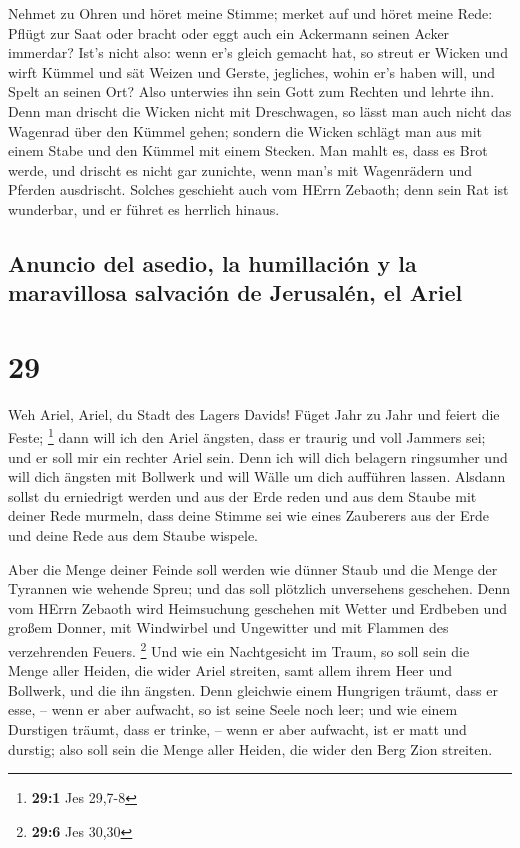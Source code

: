  Nehmet zu Ohren und höret meine Stimme; merket auf und
höret meine Rede:  Pflügt zur Saat oder bracht oder eggt
auch ein Ackermann seinen Acker immerdar?  Ist's nicht
also: wenn er's gleich gemacht hat, so streut er Wicken und wirft Kümmel
und sät Weizen und Gerste, jegliches, wohin er's haben will, und Spelt
an seinen Ort?  Also unterwies ihn sein Gott zum Rechten
und lehrte ihn.  Denn man drischt die Wicken nicht mit
Dreschwagen, so lässt man auch nicht das Wagenrad über den Kümmel gehen;
sondern die Wicken schlägt man aus mit einem Stabe und den Kümmel mit
einem Stecken.  Man mahlt es, dass es Brot werde, und
drischt es nicht gar zunichte, wenn man's mit Wagenrädern und Pferden
ausdrischt.  Solches geschieht auch vom HErrn Zebaoth;
denn sein Rat ist wunderbar, und er führet es herrlich hinaus.

\hypertarget{anuncio-del-asedio-la-humillaciuxf3n-y-la-maravillosa-salvaciuxf3n-de-jerusaluxe9n-el-ariel}{%
\subsection{Anuncio del asedio, la humillación y la maravillosa
salvación de Jerusalén, el
Ariel}\label{anuncio-del-asedio-la-humillaciuxf3n-y-la-maravillosa-salvaciuxf3n-de-jerusaluxe9n-el-ariel}}

\hypertarget{section-28}{%
\section{29}\label{section-28}}

 Weh Ariel, Ariel, du Stadt des Lagers Davids! Füget Jahr
zu Jahr und feiert die Feste; \footnote{\textbf{29:1} Jes 29,7-8}
 dann will ich den Ariel ängsten, dass er traurig und voll
Jammers sei; und er soll mir ein rechter Ariel sein.  Denn
ich will dich belagern ringsumher und will dich ängsten mit Bollwerk und
will Wälle um dich aufführen lassen.  Alsdann sollst du
erniedrigt werden und aus der Erde reden und aus dem Staube mit deiner
Rede murmeln, dass deine Stimme sei wie eines Zauberers aus der Erde und
deine Rede aus dem Staube wispele.

 Aber die Menge deiner Feinde soll werden wie dünner Staub
und die Menge der Tyrannen wie wehende Spreu; und das soll plötzlich
unversehens geschehen.  Denn vom HErrn Zebaoth wird
Heimsuchung geschehen mit Wetter und Erdbeben und großem Donner, mit
Windwirbel und Ungewitter und mit Flammen des verzehrenden Feuers.
\footnote{\textbf{29:6} Jes 30,30}  Und wie ein
Nachtgesicht im Traum, so soll sein die Menge aller Heiden, die wider
Ariel streiten, samt allem ihrem Heer und Bollwerk, und die ihn ängsten.
 Denn gleichwie einem Hungrigen träumt, dass er esse, --
wenn er aber aufwacht, so ist seine Seele noch leer; und wie einem
Durstigen träumt, dass er trinke, -- wenn er aber aufwacht, ist er matt
und durstig; also soll sein die Menge aller Heiden, die wider den Berg
Zion streiten.

